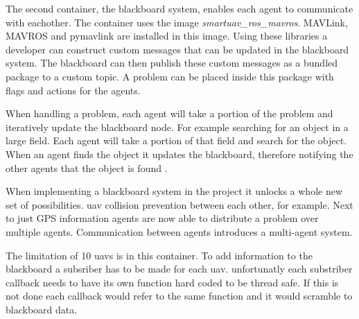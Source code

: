 
The second container, the blackboard system, enables each agent to communicate with eachother.
The container uses the image \textit{smartuav\_ros\_mavros}. MAVLink, MAVROS and pymavlink are installed in this image. 
Using these libraries a developer can construct custom messages that can be updated in the blackboard system. 
The blackboard can then publish these custom messages as a bundled package to a custom topic.
A problem can be placed inside this package with flags and actions for the agents.

When handling a problem, each agent will take a portion of the problem and iteratively update the blackboard node. 
For example searching for an object in a large field. Each agent will take a portion of that field and search for the object. 
When an agent finds the object it updates the blackboard, therefore notifying the other agents that the object is found \cite{blackboard:wiki}.

When implementing a blackboard system in the project it unlocks a whole new set of possibilities. 
\acs{uav} collision prevention between each other, for example. Next to just GPS information agents are now able to distribute a problem 
over multiple agents. 
Communication between agents introduces a multi-agent system.

The limitation of 10 \acp{uav} is in this container. To add information to the blackboard a subsriber has to be made for each \acs{uav}. 
unfortunatly each substriber callback needs to have its own function hard coded to be thread safe. If this is not done 
each callback would refer to the same function and it would scramble to blackboard data.
